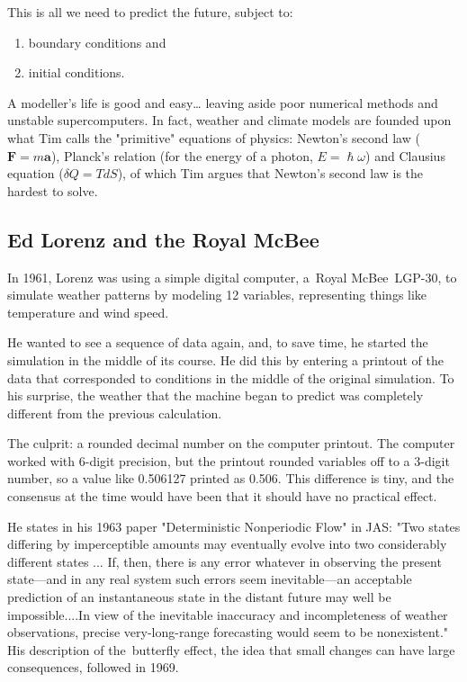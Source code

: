 This is all we need to predict the future, subject to:

\begin{enumerate}
\item boundary conditions and 
\item initial conditions.
\end{enumerate}

A modeller’s life is good and easy… leaving aside poor numerical methods and unstable supercomputers. In fact, weather and climate models are founded upon what Tim calls the "primitive" equations of physics: Newton's second law ($\mathbf{F}=m\mathbf{a}$), Planck's relation (for the energy of a photon, $E=\hslash \omega$) and Clausius equation ($\delta Q=TdS$), of which Tim argues that Newton's second law is the hardest to solve.



\subsection{Ed Lorenz and the Royal McBee}
	In 1961, Lorenz was using a simple digital computer, a Royal McBee LGP-30, to simulate weather patterns by modeling 12 variables, representing things like temperature and wind speed. 
	
	He wanted to see a sequence of data again, and, to save time, he started the simulation in the middle of its course. He did this by entering a printout of the data that corresponded to conditions in the middle of the original simulation. To his surprise, the weather that the machine began to predict was completely different from the previous calculation. 
	
	The culprit: a rounded decimal number on the computer printout. The computer worked with    6-digit precision, but the printout rounded variables off to a 3-digit number, so a value like 0.506127 printed as 0.506. This difference is tiny, and the consensus at the time would have been that it should have no practical effect. 
	
	He states in his 1963 paper "Deterministic Nonperiodic Flow" in JAS:
	"Two states differing by imperceptible amounts may eventually evolve into two considerably different states ... If, then, there is any error whatever in observing the present state—and in any real system such errors seem inevitable—an acceptable prediction of an instantaneous state in the distant future may well be impossible....In view of the inevitable inaccuracy and incompleteness of weather observations, precise very-long-range forecasting would seem to be nonexistent."
	His description of the butterfly effect, the idea that small changes can have large consequences, followed in 1969.
	
